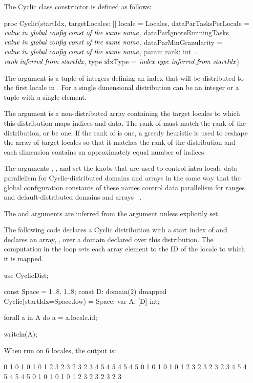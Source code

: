 The Cyclic class constructor is defined as follows:
\begin{chapel}
proc Cyclic(startIdx,
           targetLocales: [] locale = Locales,
           dataParTasksPerLocale = $\mbox{{\it value in global config const of the same name}}$,
           dataParIgnoreRunningTasks = $\mbox{{\it value in global config const of the same name}}$,
           dataParMinGranularity = $\mbox{{\it value in global config const of the same name}}$,
           param rank: int = $\mbox{{\it rank inferred from startIdx}}$,
           type idxType = $\mbox{{\it index type inferred from startIdx}}$)
\end{chapel}

The argument  is a tuple of integers defining an index that
will be distributed to the first locale in . For a single
dimensional distribution  can be an integer or a tuple with a
single element.

The argument  is a non-distributed array
containing the target locales to which this distribution maps indices
and data.  The rank of  must match the rank of the
distribution, or be one.  If the rank of
 is one, a greedy heuristic is used to reshape the
array of target locales so that it matches the rank of the
distribution and each dimension contains an approximately equal number
of indices.

The
arguments , ,
and  set the knobs that are used to
control intra-locale data parallelism for Cyclic-distributed domains
and arrays in the same way that the global configuration constants of
these names control data parallelism for ranges and
default-distributed domains and arrays ~.

The  and  arguments are inferred from the
 argument unless explicitly set.

\begin{example}
The following code declares a Cyclic distribution with a start index
of  and declares an array, , over a domain
declared over this distribution.  The computation in the 
loop sets each array element to the ID of the locale to which it is
mapped.
\begin{chapel}
use CyclicDist;

const Space = {1..8, 1..8};
const D: domain(2) dmapped Cyclic(startIdx=Space.low) = Space;
var A: [D] int;

forall a in A do
  a = a.locale.id;

writeln(A);
\end{chapel}
When run on 6 locales, the output is:
\begin{chapel}
0 1 0 1 0 1 0 1
2 3 2 3 2 3 2 3
4 5 4 5 4 5 4 5
0 1 0 1 0 1 0 1
2 3 2 3 2 3 2 3
4 5 4 5 4 5 4 5
0 1 0 1 0 1 0 1
2 3 2 3 2 3 2 3
\end{chapel}
\end{example}


